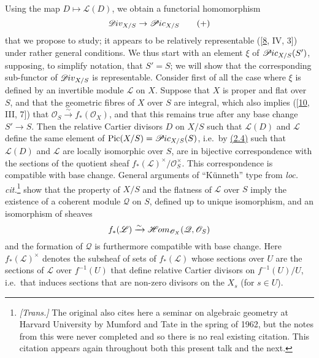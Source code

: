 \documentclass{article}
\theoremstyle{definition}
\theoremstyle{definition}
\theoremstyle{definition}
\theoremstyle{definition}
\theoremstyle{remark}
\begin{document}
Using the map \(D\mapsto{\mathscr{L}}(D)\), we obtain a functorial homomorphism
\[
  \mathscr{D}\kern -.5pt iv_{X/S}
  \to \mathscr{P}\kern -.5pt ic_{X/S}
\tag{+}
\]
that we propose to study;
it appears to be relatively representable ({[}\protect\hyperlink{ref-Gro1960a}{8}, IV, 3{]}) under rather general conditions.
We thus start with an element \(\xi\) of \(\mathscr{P}\kern -.5pt ic_{X/S}(S')\), supposing, to simplify notation, that \(S'=S\);
we will show that the corresponding sub-functor of \(\mathscr{D}\kern -.5pt iv_{X/S}\) is representable.
Consider first of all the case where \(\xi\) is defined by an invertible module \({\mathscr{L}}\) on \(X\).
Suppose that \(X\) is proper and flat over \(S\), and that the geometric fibres of \(X\) over \(S\) are integral, which also implies ({[}\protect\hyperlink{ref-GD1960}{10}, III, 7{]}) that \({\mathscr{O}}_S\xrightarrow{\sim}f_*({\mathscr{O}}_X)\), and that this remains true after any base change \(S'\to S\).
Then the relative Cartier divisors \(D\) on \(X/S\) such that \({\mathscr{L}}(D)\) and \({\mathscr{L}}\) define the same element of \(\operatorname{Pic}(X/S)=\mathscr{P}\kern -.5pt ic_{X/S}(S)\), i.e.~by \protect\hyperlink{fga-3-v-corollary-2.4}{(2.4)} such that \({\mathscr{L}}(D)\) and \({\mathscr{L}}\) are locally isomorphic over \(S\), are in bijective correspondence with the sections of the quotient sheaf \(f_*({\mathscr{L}})^\times/{\mathscr{O}}_S^\times\).
This correspondence is compatible with base change.
General arguments of ``Künneth'' type from \emph{loc. cit.}\footnote{\emph{{[}Trans.{]}} The original also cites here a seminar on algebraic geometry at Harvard University by Mumford and Tate in the spring of 1962, but the notes from this were never completed and so there is no real existing citation. This citation appears again throughout both this present talk and the next.} show that the property of \(X/S\) and the flatness of \({\mathscr{L}}\) over \(S\) imply the existence of a coherent module \({\mathscr{Q}}\) on \(S\), defined up to unique isomorphism, and an isomorphism of sheaves
\[
  f_*({\mathscr{L}})
  \xrightarrow{\sim}\mathscr{H}\kern -.5pt om_{{\mathscr{O}}_X}({\mathscr{Q}},{\mathscr{O}}_S)
\]
and the formation of \({\mathscr{Q}}\) is furthermore compatible with base change.
Here \(f_*({\mathscr{L}})^\times\) denotes the subsheaf of sets of \(f_*({\mathscr{L}})\) whose sections over \(U\) are the sections of \({\mathscr{L}}\) over \(f^{-1}(U)\) that define relative Cartier divisors on \(f^{-1}(U)/U\), i.e.~that induces sections that are non-zero divisors on the \(X_s\) (for \(s\in U\)).
\end{document}
